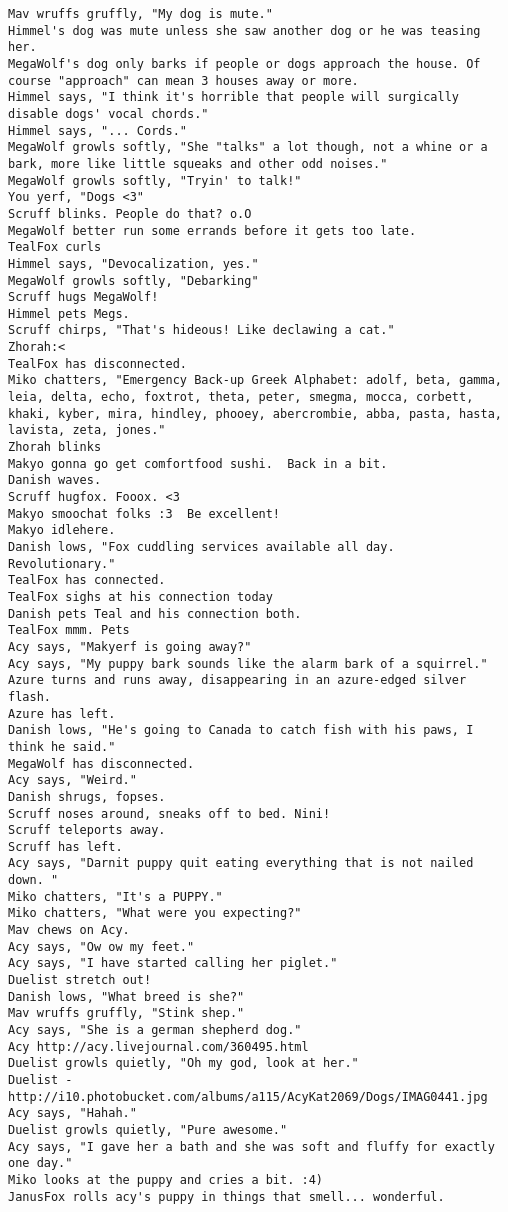 \begin{verbatim}
Mav wruffs gruffly, "My dog is mute."
Himmel's dog was mute unless she saw another dog or he was teasing her.
MegaWolf's dog only barks if people or dogs approach the house. Of course "approach" can mean 3 houses away or more.
Himmel says, "I think it's horrible that people will surgically disable dogs' vocal chords."
Himmel says, "... Cords."
MegaWolf growls softly, "She "talks" a lot though, not a whine or a bark, more like little squeaks and other odd noises."
MegaWolf growls softly, "Tryin' to talk!"
You yerf, "Dogs <3"
Scruff blinks. People do that? o.O
MegaWolf better run some errands before it gets too late.
TealFox curls
Himmel says, "Devocalization, yes."
MegaWolf growls softly, "Debarking"
Scruff hugs MegaWolf!
Himmel pets Megs.
Scruff chirps, "That's hideous! Like declawing a cat."
Zhorah:<
TealFox has disconnected.
Miko chatters, "Emergency Back-up Greek Alphabet: adolf, beta, gamma, leia, delta, echo, foxtrot, theta, peter, smegma, mocca, corbett, khaki, kyber, mira, hindley, phooey, abercrombie, abba, pasta, hasta, lavista, zeta, jones."
Zhorah blinks
Makyo gonna go get comfortfood sushi.  Back in a bit.
Danish waves.
Scruff hugfox. Fooox. <3
Makyo smoochat folks :3  Be excellent!
Makyo idlehere.
Danish lows, "Fox cuddling services available all day.  Revolutionary."
TealFox has connected.
TealFox sighs at his connection today
Danish pets Teal and his connection both.
TealFox mmm. Pets
Acy says, "Makyerf is going away?"
Acy says, "My puppy bark sounds like the alarm bark of a squirrel."
Azure turns and runs away, disappearing in an azure-edged silver flash.
Azure has left.
Danish lows, "He's going to Canada to catch fish with his paws, I think he said."
MegaWolf has disconnected.
Acy says, "Weird."
Danish shrugs, fopses.
Scruff noses around, sneaks off to bed. Nini!
Scruff teleports away.
Scruff has left.
Acy says, "Darnit puppy quit eating everything that is not nailed down. "
Miko chatters, "It's a PUPPY."
Miko chatters, "What were you expecting?"
Mav chews on Acy.
Acy says, "Ow ow my feet."
Acy says, "I have started calling her piglet."
Duelist stretch out!
Danish lows, "What breed is she?"
Mav wruffs gruffly, "Stink shep."
Acy says, "She is a german shepherd dog."
Acy http://acy.livejournal.com/360495.html
Duelist growls quietly, "Oh my god, look at her."
Duelist - http://i10.photobucket.com/albums/a115/AcyKat2069/Dogs/IMAG0441.jpg
Acy says, "Hahah."
Duelist growls quietly, "Pure awesome."
Acy says, "I gave her a bath and she was soft and fluffy for exactly one day."
Miko looks at the puppy and cries a bit. :4)
JanusFox rolls acy's puppy in things that smell... wonderful.

\end{verbatim}
